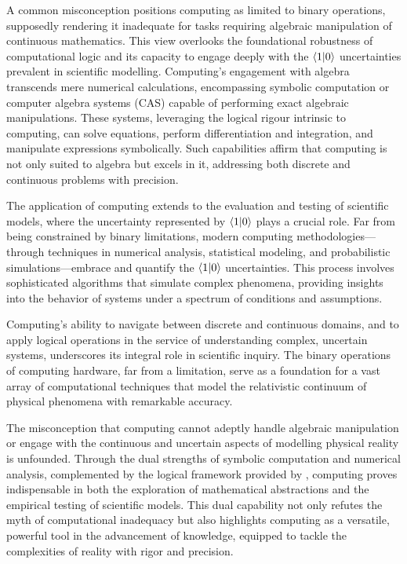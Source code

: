 \documentclass[12pt]{article}
\begin{document}
A common misconception positions computing as limited to binary operations, supposedly rendering it inadequate for tasks requiring algebraic manipulation of continuous mathematics. This view overlooks the foundational robustness of computational logic and its capacity to engage deeply with the \(\langle 1 | 0 \rangle\) uncertainties prevalent in scientific modelling. Computing's engagement with algebra transcends mere numerical calculations, encompassing symbolic computation or computer algebra systems (CAS) capable of performing exact algebraic manipulations. These systems, leveraging the logical rigour intrinsic to computing, can solve equations, perform differentiation and integration, and manipulate expressions symbolically. Such capabilities affirm that computing is not only suited to algebra but excels in it, addressing both discrete and continuous problems with precision.

The application of computing extends to the evaluation and testing of scientific models, where the uncertainty represented by \(\langle 1 | 0 \rangle\) plays a crucial role. Far from being constrained by binary limitations, modern computing methodologies—through techniques in numerical analysis, statistical modeling, and probabilistic simulations—embrace and quantify the \(\langle 1 | 0 \rangle\) uncertainties. This process involves sophisticated algorithms that simulate complex phenomena, providing insights into the behavior of systems under a spectrum of conditions and assumptions.

Computing's ability to navigate between discrete and continuous domains, and to apply logical operations in the service of understanding complex, uncertain systems, underscores its integral role in scientific inquiry. The binary operations of computing hardware, far from a limitation, serve as a foundation for a vast array of computational techniques that model the relativistic continuum of physical phenomena with remarkable accuracy.

The misconception that computing cannot adeptly handle algebraic manipulation or engage with the continuous and uncertain aspects of modelling physical reality is unfounded. Through the dual strengths of symbolic computation and numerical analysis, complemented by the logical framework provided by \iR{}, computing proves indispensable in both the exploration of mathematical abstractions and the empirical testing of scientific models. This dual capability not only refutes the myth of computational inadequacy but also highlights computing as a versatile, powerful tool in the advancement of knowledge, equipped to tackle the complexities of reality with rigor and precision.
\end{document}
